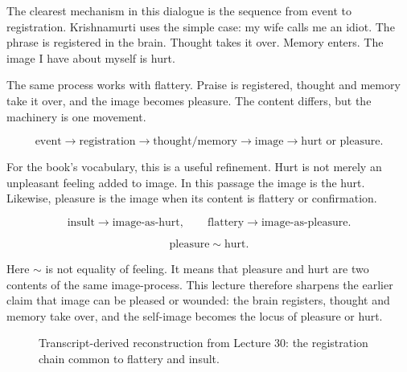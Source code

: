 \documentclass[11pt,oneside]{book}
\begin{document}
The clearest mechanism in this dialogue is the sequence from event to registration. Krishnamurti uses the simple case: my wife calls me an idiot. The phrase is registered in the brain. Thought takes it over. Memory enters. The image I have about myself is hurt.

The same process works with flattery. Praise is registered, thought and memory take it over, and the image becomes pleasure. The content differs, but the machinery is one movement.

\begin{equation}
\text{event}
\longrightarrow
\text{registration}
\longrightarrow
\text{thought/memory}
\longrightarrow
\text{image}
\longrightarrow
\text{hurt or pleasure}.
\end{equation}

For the book's vocabulary, this is a useful refinement. Hurt is not merely an unpleasant feeling added to image. In this passage the image is the hurt. Likewise, pleasure is the image when its content is flattery or confirmation.

\begin{equation}
\text{insult} \longrightarrow \text{image-as-hurt},
\qquad
\text{flattery} \longrightarrow \text{image-as-pleasure}.
\end{equation}

\begin{equation}
\text{pleasure} \sim \text{hurt}.
\end{equation}

Here \(\sim\) is not equality of feeling. It means that pleasure and hurt are two contents of the same image-process. This lecture therefore sharpens the earlier claim that image can be pleased or wounded: the brain registers, thought and memory take over, and the self-image becomes the locus of pleasure or hurt.

\begin{figure}
\centering
{}
\caption{Transcript-derived reconstruction from Lecture 30: the registration chain common to flattery and insult.}
\end{figure}
\end{document}
